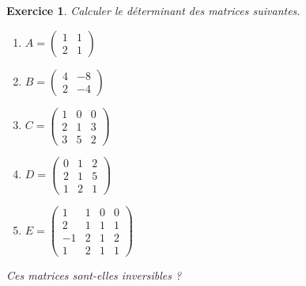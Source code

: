\documentclass[12pt]{article}
\newtheorem{exercice}{\bf Exercice}
\newenvironment{exo}{
\begin{exercice}\smallskip\normalfont}{\end{exercice}
}
\newif\ifcorrige\corrigetrue
\begin{document}
\begin{exo}
  Calculer le d\'eterminant des matrices suivantes.
  \begin{multicols}{3}
    \begin{enumerate}
    \item
      $A=\begin{pmatrix}
        1 & 1
        \\
        2 & 1
      \end{pmatrix}$

    \item 
      $B=\begin{pmatrix}
        4 & -8
        \\
        2 & -4
      \end{pmatrix}$
    \item 
      $C=\begin{pmatrix}
        1 & 0 & 0
        \\
        2 & 1 & 3
        \\
        3 & 5 & 2
      \end{pmatrix}$
    \item 
      $D=\begin{pmatrix}
        0 & 1 & 2
        \\
        2 & 1 & 5
        \\
        1 & 2 & 1
      \end{pmatrix}$
    \item 
      $E=\begin{pmatrix}
        1 & 1 & 0 & 0
        \\
        2 & 1 & 1 & 1
        \\
        -1 & 2 & 1 & 2
        \\
        1 & 2 & 1 & 1
      \end{pmatrix}$
    \end{enumerate}
  \end{multicols}
Ces matrices sont-elles inversibles ?
\end{exo}
\ifcorrige
\color{magenta}
\end{document}
